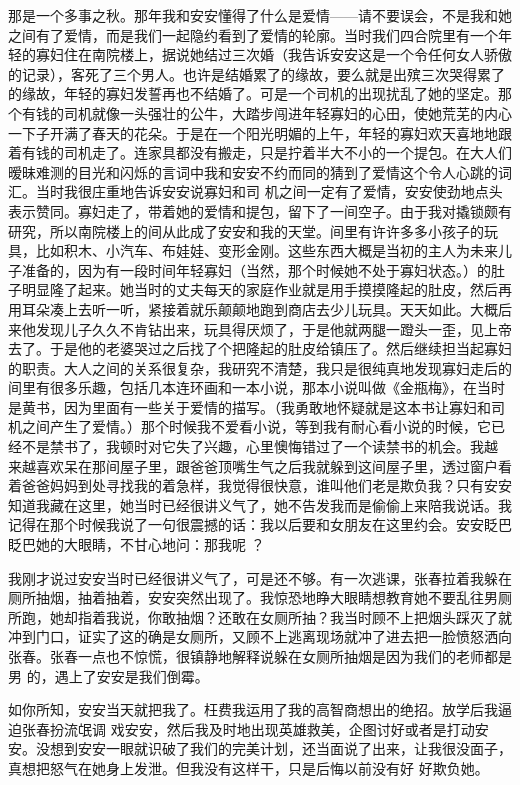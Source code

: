 \documentclass{article}
\begin{document}
那是一个多事之秋。那年我和安安懂得了什么是爱情——请不要误会，不是我和她之间有了爱情，而是我们一起隐约看到了爱情的轮廓。当时我们四合院里有一个年轻的寡妇住在南院楼上，据说她结过三次婚（我告诉安安这是一个令任何女人骄傲的记录），客死了三个男人。也许是结婚累了的缘故，要么就是出殡三次哭得累了的缘故，年轻的寡妇发誓再也不结婚了。可是一个司机的出现扰乱了她的坚定。那个有钱的司机就像一头强壮的公牛，大踏步闯进年轻寡妇的心田，使她荒芜的内心一下子开满了春天的花朵。于是在一个阳光明媚的上午，年轻的寡妇欢天喜地地跟着有钱的司机走了。连家具都没有搬走，只是拧着半大不小的一个提包。在大人们暧昧难测的目光和闪烁的言词中我和安安不约而同的猜到了爱情这个令人心跳的词汇。当时我很庄重地告诉安安说寡妇和司
\newpage
机之间一定有了爱情，安安使劲地点头表示赞同。寡妇走了，带着她的爱情和提包，留下了一间空子。由于我对撬锁颇有研究，所以南院楼上的间从此成了安安和我的天堂。间里有许许多多小孩子的玩具，比如积木、小汽车、布娃娃、变形金刚。这些东西大概是当初的主人为未来儿子准备的，因为有一段时间年轻寡妇（当然，那个时候她不处于寡妇状态。）的肚子明显隆了起来。她当时的丈夫每天的家庭作业就是用手摸摸隆起的肚皮，然后再用耳朵凑上去听一听，紧接着就乐颠颠地跑到商店去少儿玩具。天天如此。大概后来他发现儿子久久不肯钻出来，玩具得厌烦了，于是他就两腿一蹬头一歪，见上帝去了。于是他的老婆哭过之后找了个把隆起的肚皮给镇压了。然后继续担当起寡妇的职责。大人之间的关系很复杂，我研究不清楚，我只是很纯真地发现寡妇走后的间里有很多乐趣，包括几本连环画和一本小说，那本小说叫做《金瓶梅》，在当时是黄书，因为里面有一些关于爱情的描写。（我勇敢地怀疑就是这本书让寡妇和司机之间产生了爱情。）那个时候我不爱看小说，等到我有耐心看小说的时候，它已经不是禁书了，我顿时对它失了兴趣，心里懊悔错过了一个读禁书的机会。我越
\newpage
来越喜欢呆在那间屋子里，跟爸爸顶嘴生气之后我就躲到这间屋子里，透过窗户看着爸爸妈妈到处寻找我的着急样，我觉得很快意，谁叫他们老是欺负我？只有安安知道我藏在这里，她当时已经很讲义气了，她不告发我而是偷偷上来陪我说话。我记得在那个时候我说了一句很震撼的话：我以后要和女朋友在这里约会。安安眨巴眨巴她的大眼睛，不甘心地问：那我呢
？ 

我刚才说过安安当时已经很讲义气了，可是还不够。有一次逃课，张春拉着我躲在厕所抽烟，抽着抽着，安安突然出现了。我惊恐地睁大眼睛想教育她不要乱往男厕所跑，她却指着我说，你敢抽烟？还敢在女厕所抽？我当时顾不上把烟头踩灭了就冲到门口，证实了这的确是女厕所，又顾不上逃离现场就冲了进去把一脸愤怒洒向张春。张春一点也不惊慌，很镇静地解释说躲在女厕所抽烟是因为我们的老师都是男
的，遇上了安安是我们倒霉。 

如你所知，安安当天就把我了。枉费我运用了我的高智商想出的绝招。放学后我逼迫张春扮流氓调
\newpage
戏安安，然后我及时地出现英雄救美，企图讨好或者是打动安安。没想到安安一眼就识破了我们的完美计划，还当面说了出来，让我很没面子，真想把怒气在她身上发泄。但我没有这样干，只是后悔以前没有好
好欺负她。 
\end{document}

